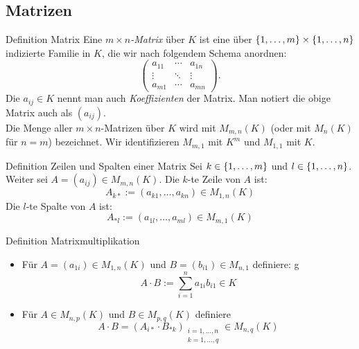 \documentclass[main.tex]{subfiles}
\begin{document}
\subsection*{Matrizen}
\begin{karte}{Definition Matrix}
    Eine \textit{\(m \times n\)-Matrix} über \(K\) ist 
    eine über \( \{1,\ldots,m\} \times \{1,\ldots,n\} \) 
    indizierte Familie in \(K\), die wir nach folgendem Schema 
    anordnen:
    \[ \begin{pmatrix}
        a_{11} & \cdots & a_{1n}\\
        \vdots & \ddots & \vdots \\
        a_{m1} & \cdots & a_{mn}
    \end{pmatrix}. \]
    Die \( a_{ij} \in K \) nennt man auch 
    \textit{Koeffizienten} der Matrix. Man notiert die obige 
    Matrix auch als \( (a_{ij}) \). \\
    Die Menge aller \( m \times n \)-Matrizen über \(K\) wird 
    mit \( M_{m,n}(K) \) (oder mit \(M_n(K)\) für \(n=m\)) 
    bezeichnet. Wir identifizieren \( M_{m,1} \) mit \(K^m\) 
    und \( M_{1,1} \) mit \(K\).
\end{karte}
\begin{karte}{Definition Zeilen und Spalten einer Matrix}
    Sei \(k \in \{1, \ldots, m\}\) und \(l \in \{1, \ldots , n\}\).
    Weiter sei \(A = (a_{ij}) \in M_{m,n}(K)\). 
    Die \(k\)-te Zeile von \(A\) ist: 
    \[A_{k*} := (a_{k1},  \ldots, a_{kn}) \in M_{1,n}(K)\]
    Die \(l\)-te Spalte von \(A\) ist:
    \[A_{*l} := (a_{1l}, \ldots , a_{ml}) \in M_{m,1}(K)\]                        
\end{karte}
\begin{karte}{Definition Matrixmultiplikation}
    \begin{itemize}
        \item Für \(A = (a_{1i}) \in M_{1,n}(K)\) und 
        \(B = (b_{i1}) \in M_{n,1}\) definiere: g
        \[A \cdot B := \sum_{i=1}^n a_{1i}b_{i1} \in K\]
        \item Für \(A \in M_{n,p}(K)\) und \(B \in M_{p,q}(K)\) definiere
        \[A \cdot B = {(A_{i*} \cdot B_{*k})}_{\substack{i=1,\ldots,n \\ k=1,\ldots,q}} 
        \in M_{n,q}(K) \]
    \end{itemize}
\end{karte}
\end{document}
